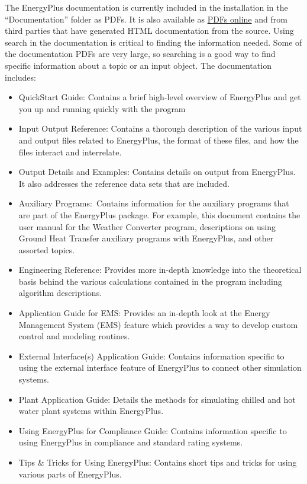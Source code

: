 The EnergyPlus documentation is currently included in the installation
in the ``Documentation'' folder as PDFs. It is also available as
\href{https://energyplus.net/documentation}{PDFs online} and from
third parties that have generated HTML documentation from the source.
Using search in the documentation is critical to finding the information
needed. Some of the documentation PDFs are very large, so searching
is a good way to find specific information about a topic or an input
object. The documentation includes:
\begin{itemize}
\item QuickStart Guide: Contains a brief high-level overview of EnergyPlus
and get you up and running quickly with the program
\item Input Output Reference: Contains a thorough description of the various
input and output files related to EnergyPlus, the format of these
files, and how the files interact and interrelate.
\item Output Details and Examples: Contains details on output from EnergyPlus.
It also addresses the reference data sets that are included.
\item Auxiliary Programs:~Contains information for the auxiliary programs
that are part of the EnergyPlus package. For example, this document
contains the user manual for the Weather Converter program, descriptions
on using Ground Heat Transfer auxiliary programs with EnergyPlus,
and other assorted topics.
\item Engineering Reference: Provides more in-depth knowledge into the theoretical
basis behind the various calculations contained in the program including
algorithm descriptions.
\item Application Guide for EMS: Provides an in-depth look at the Energy
Management System (EMS) feature which provides a way to develop custom
control and modeling routines.
\item External Interface(s) Application Guide: Contains information specific
to using the external interface feature of EnergyPlus to connect other
simulation systems.
\item Plant Application Guide: Details the methods for simulating chilled
and hot water plant systems within EnergyPlus.
\item Using EnergyPlus for Compliance Guide: Contains information specific
to using EnergyPlus in compliance and standard rating systems.
\item Tips \& Tricks for Using EnergyPlus: Contains short tips and tricks
for using various parts of EnergyPlus.
\end{itemize}

